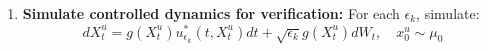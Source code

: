 \documentclass{amsart}
\numberwithin{equation}{section}
\begin{document}
\begin{algorithm}
{\begin{enumerate}
\begin{enumerate}
\begin{enumerate}
\end{enumerate}

\item \textbf{Compute optimal quantities $\{\rho_{\epsilon_k}^*, u_{\epsilon_k}^*\}_{k=0}^K$:}
\begin{align*}
\rho_{\epsilon_k}^*(t,x) = \widehat{\varphi}_{\epsilon_k}^*(t,x) \varphi_{\epsilon_k}^*(t,x)\quad\text{and}\quad
u_{\epsilon_k}^*(t,x) = \epsilon_k   g(x)^\top \nabla \log \varphi_{\epsilon_k}^*(t,x)
\end{align*}
\end{enumerate}
\item \textbf{Simulate controlled dynamics for verification:}
For each $\epsilon_k$, simulate:
\[
dX_t^u = g(X_t^u) u_{\epsilon_k}^*(t, X_t^u) dt + \sqrt{\epsilon_k} g(X_t^u) dW_t,
\quad x_0^u \sim \mu_0
\]
\end{enumerate}
}
\end{algorithm}
\end{document}
